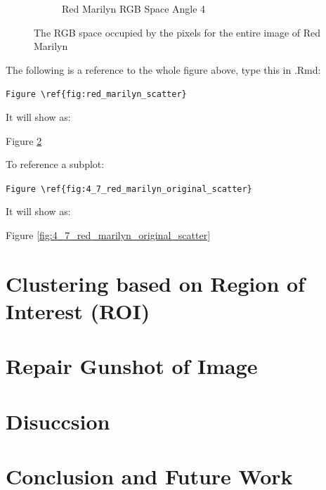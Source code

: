 \documentclass{article}
\begin{document}
\begin{figure}[ht]
\begin{subfigure}{0.24\textwidth}
    \caption{Red Marilyn RGB Space Angle 4}
    \label{fig:4_8_red_marilyn_original_scatter}
  \end{subfigure}
  \caption{The RGB space occupied by the pixels for the entire image of Red Marilyn}
  \label{fig:red_marilyn_scatter}
\end{figure}

The following is a reference to the whole figure above, type this in
.Rmd:

\texttt{Figure\ \textbackslash{}ref\{fig:red\_marilyn\_scatter\}}

It will show as:

Figure \ref{fig:red_marilyn_scatter}

To reference a subplot:

\texttt{Figure\ \textbackslash{}ref\{fig:4\_7\_red\_marilyn\_original\_scatter\}}

It will show as:

Figure \ref{fig:4_7_red_marilyn_original_scatter}

\hypertarget{clustering-based-on-region-of-interest-roi}{%
\section{Clustering based on Region of Interest
(ROI)}\label{clustering-based-on-region-of-interest-roi}}

\hypertarget{repair-gunshot-of-image}{%
\section{Repair Gunshot of Image}\label{repair-gunshot-of-image}}

\hypertarget{disuccsion}{%
\section{Disuccsion}\label{disuccsion}}

\hypertarget{conclusion-and-future-work}{%
\section{Conclusion and Future Work}\label{conclusion-and-future-work}}



\end{document}
